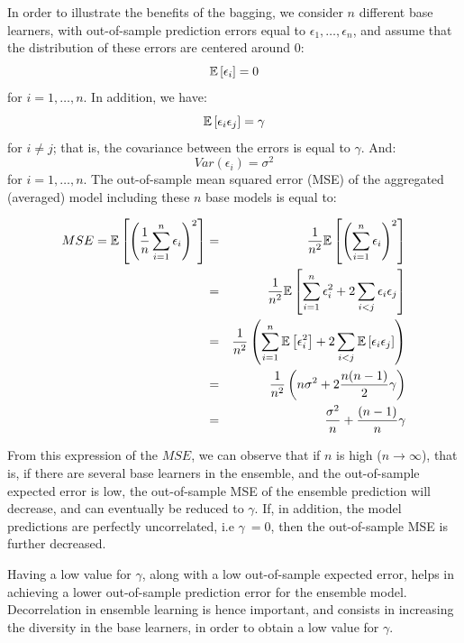 \medskip

In order to illustrate the benefits of the bagging, we consider $n$ different base learners, with out-of-sample prediction errors equal to $\epsilon_1, \ldots, \epsilon_n$, and assume that the distribution of these errors are centered around $0$:
$$
\mathbb{E} \left[ \epsilon_i\right] = 0
$$
for $i = 1, \ldots, n$. In addition, we have:
$$
\mathbb{E} \left[ \epsilon_i \epsilon_j\right] = \gamma
$$
for $i \neq j$; that is, the covariance between the errors is equal to $\gamma$. And:
$$
Var(\epsilon_i) = \sigma^2
$$
for $i = 1, \ldots, n$. The out-of-sample mean squared error (MSE) of the aggregated (averaged) model including these $n$ base models is equal to:

\begin{eqnarray*}
MSE = \mathbb{E}\left[ \left( \frac{1}{n} \sum_{i = 1}^n \epsilon_i \right)^2 \right] &=& \frac{1}{n^2} \mathbb{E}\left[ \left( \sum_{i = 1}^n \epsilon_i \right)^2 \right]\\
 &=& \frac{1}{n^2} \mathbb{E}\left[ \sum_{i = 1}^n \epsilon_i^2 + 2 \sum_{i < j} \epsilon_i \epsilon_j  \right]\\
 &=& \frac{1}{n^2} \left( \sum_{i = 1}^n \mathbb{E}\left[\epsilon_i^2\right] + 2 \sum_{i < j} \mathbb{E}\left[\epsilon_i \epsilon_j  \right] \right)\\
 &=& \frac{1}{n^2} \left( n \sigma^2 + 2 \frac{n(n-1)}{2} \gamma \right)\\
 &=& \frac{\sigma^2}{n} + \frac{(n-1)}{n} \gamma \\
\end{eqnarray*}

From this expression of the $MSE$, we can observe that if $n$ is high ($n \rightarrow \infty$), that is, if there are several base learners in the ensemble, and the out-of-sample expected error is low, the out-of-sample MSE of the ensemble prediction will decrease, and can eventually be reduced to $\gamma$. If, in addition, the model predictions are perfectly uncorrelated, i.e $\gamma ~= 0$, then the out-of-sample MSE is further decreased.

\medskip

Having a low value for $\gamma$, along with a low out-of-sample expected error, helps in achieving a lower out-of-sample prediction error for the ensemble model. Decorrelation in ensemble learning is hence important, and consists in increasing the diversity in the base learners, in order to obtain a low value for $\gamma$.

\medskip

